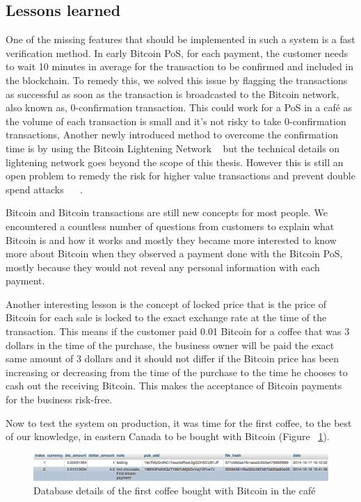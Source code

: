 \subsection{Lessons learned}
One of the missing features that should be implemented in such a system is a fast verification method. In early Bitcoin PoS, for each payment, the customer needs to wait 10 minutes in average for the transaction to be confirmed and included in the blockchain. To remedy this, we solved this issue by flagging the transactions as successful as soon as the transaction is broadcasted to the Bitcoin network, also known as, 0-confirmation transaction. This could work for a PoS in a caf\'{e} as the volume of each transaction is small and it's not risky to take 0-confirmation transactions, Another newly introduced method to overcome the confirmation time is by using the Bitcoin Lightening Network ~\cite{poon2015bitcoin} but the technical details on lightening network goes beyond the scope of this thesis. However this is still an open problem to remedy the risk for higher value transactions and prevent double spend attacks ~\cite{karame2012two} ~\cite{bamert2013have}. 

Bitcoin and Bitcoin transactions are still new concepts for most people. We encountered a countless number of questions from customers to explain what Bitcoin is and how it works and mostly they became more interested to know more about Bitcoin when they observed a payment done with the Bitcoin PoS, mostly because they would not reveal any personal information with each payment.

Another interesting lesson is the concept of locked price that is the price of Bitcoin for each sale is locked to the exact exchange rate at the time of the transaction. This means if the customer paid 0.01 Bitcoin for a coffee that was 3 dollars in the time of the purchase, the business owner will be paid the exact same amount of 3 dollars and it should not differ if the Bitcoin price has been increasing or decreasing from the time of the purchase to the time he chooses to cash out the receiving Bitcoin. This makes the acceptance of Bitcoin payments for the business risk-free.

Now to test the system on production, it was time for the first coffee, to the best of our knowledge, in eastern Canada to be bought with Bitcoin (Figure ~\ref{fig:firsttransaction}).

\begin{figure}[htb!p]
\centering
\includegraphics[width=\linewidth]{fig/first_cafe_transaction.png}
  \caption{Database details of the first coffee bought with Bitcoin in the caf\'{e}}
\label{fig:firsttransaction}
\end{figure}



